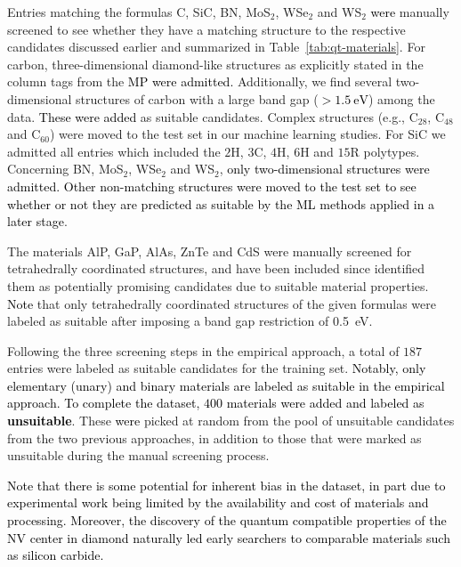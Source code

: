 \documentclass[superscriptaddress,unsortedaddress,
 amsmath,amssymb,
 aps,
]{revtex4-2}
\newcommand{\mrk}[1]{\textcolor{black}{#1}}
\begin{document}
Entries matching the formulas C, SiC, BN, MoS$_2$, WSe$_2$ and WS$_2$ \mrk{were} manually screened to see whether they have a matching structure to the respective candidates discussed earlier and summarized in Table~\ref{tab:qt-materials}. 
For carbon, three-dimensional diamond-like structures as explicitly stated in the column tags from the \mrk{MP} \mrk{were admitted.} Additionally, we find several two-dimensional structures of carbon with a large band gap (\mrk{$>\SI{1.5}{\electronvolt}$}) among the data. \mrk{These were added} as suitable candidates. Complex structures (e.g., C$_{28}$, C$_{48}$ and C$_{60}$) were moved to the test set in our machine learning studies. For SiC we admitted all entries which included the $2$H, $3$C, $4$H, $6$H and $15$R polytypes. Concerning BN, MoS$_2$, WSe$_2$ and WS$_2$, \mrk{only two-dimensional structures were admitted. 
Other non-matching structures were moved to the test set to see whether or not they are predicted as suitable by the ML methods applied in a later stage}.

The materials AlP, GaP, AlAs, ZnTe and CdS were manually screened for tetrahedrally coordinated structures, and have been included since \citeauthor{Weber2010} \cite{Weber2010} identified them as potentially promising candidates due to suitable material properties. 
\mrk{Note} that only tetrahedrally coordinated structures of the given formulas were labeled as suitable after imposing a band gap restriction of \SI{0.5}{\electronvolt}. 

Following the three screening steps in the empirical approach, a total of $187$ entries were labeled as suitable candidates for the training set. \mrk{Notably, only elementary (unary) and binary materials are labeled as suitable in the empirical approach.} \mrk{To complete the dataset, $400$ materials were added and labeled as \textbf{unsuitable}}. These \mrk{were} picked at random from the pool of unsuitable candidates from the two previous approaches, in addition to those that were marked as unsuitable during the manual screening process. 

\mrk{Note that there is some potential for inherent bias in the dataset, in part due to experimental work being limited by the availability and cost of materials and processing. Moreover, the discovery of the quantum compatible properties of the NV center in diamond naturally led early searchers to comparable materials such as silicon carbide.  %
} 
\end{document}
